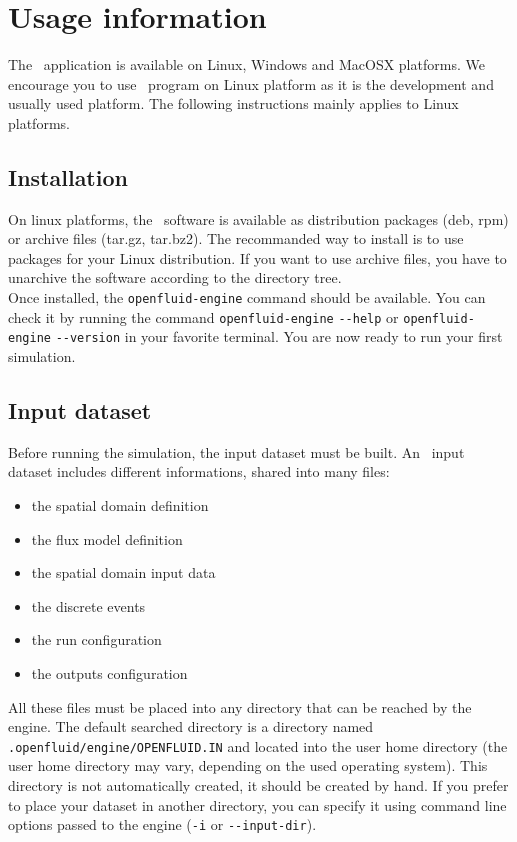 \chapter{Usage information}

The \OFEname \ application is available on Linux, Windows and MacOSX platforms.
We encourage you to use \OFEname \ program on Linux platform as it is the development and usually used platform. The following instructions mainly applies to Linux platforms.   

\section{Installation}

On linux platforms, the \OFEname \ software is available as distribution packages (deb, rpm) or archive files (tar.gz, tar.bz2).  
The recommanded way to install is to use packages for your Linux distribution. If you want to use archive files, you have to unarchive the software according to the directory tree.\\
Once installed, the \texttt{openfluid-engine} command should be available. You can check it by running the command \texttt{openfluid-engine} \verb?--?\texttt{help} or \texttt{openfluid-engine} \verb?--?\texttt{version} in your favorite terminal. You are now ready to run your first simulation.  

\section{Input dataset}

Before running the simulation, the input dataset must be built.
An \OFEname \ input dataset includes different informations, shared into many files:
\begin{itemize}
  \item the spatial domain definition
  \item the flux model definition
  \item the spatial domain input data 
  \item the discrete events
  \item the run configuration
  \item the outputs configuration
\end{itemize}

\noindent All these files must be placed into any directory that can be reached by the
engine. The default searched directory is a directory named
\texttt{.openfluid/engine/OPENFLUID.IN} and located into the user home
directory (the user home directory may vary, depending on the used operating
system). This directory is not automatically created, it should be created by hand.
If you prefer to place your dataset in another directory, you can
specify it using command line options passed to the engine (\texttt{-i} or \verb?--?\texttt{input-dir}).\\

